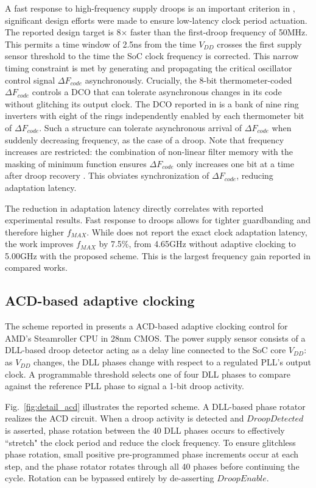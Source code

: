 \documentclass[twoside,9pt,journal,letterpage]{IEEEtran}
\begin{document}
A fast response to high-frequency supply droops is an important criterion in \cite{hashimoto2018}, significant design efforts were made to ensure low-latency clock period actuation. The reported design target is 8$\times$ faster than the first-droop frequency of 50MHz. This permits a time window of 2.5ns from the time $V_{DD}$ crosses the first supply sensor threshold to the time the SoC clock frequency is corrected. This narrow timing constraint is met by generating and propagating the critical oscillator control signal $\Delta F_{code}$ asynchronously. Crucially, the 8-bit thermometer-coded $\Delta F_{code}$ controls a DCO that can tolerate asynchronous changes in its code without glitching its output clock. The DCO reported in \cite{hashimoto2018} is a bank of nine ring inverters with eight of the rings independently enabled by each thermometer bit of $\Delta F_{code}$. Such a structure can tolerate asynchronous arrival of $\Delta F_{code}$ when suddenly decreasing frequency, as the case of a droop. Note that frequency increases are restricted: the combination of non-linear filter memory with the masking of minimum function ensures $\Delta F_{code}$ only increases one bit at a time after droop recovery \cite{hashimoto2018}. This obviates synchronization of $\Delta F_{code}$, reducing adaptation latency.

The reduction in adaptation latency directly correlates with reported experimental results. Fast response to droops allows for tighter guardbanding and therefore higher $f_{MAX}$. While \cite{hashimoto2018} does not report the exact clock adaptation latency, the work improves $f_{MAX}$ by 7.5\%, from 4.65GHz without adaptive clocking to 5.00GHz with the proposed scheme. This is the largest frequency gain reported in compared works.

\subsection{ACD-based adaptive clocking}
\label{sec:details_acd}
The scheme reported in \cite{wilcox2015} presents a ACD-based adaptive clocking control for AMD's Steamroller CPU in 28nm CMOS. The power supply sensor consists of a DLL-based droop detector acting as a delay line connected to the SoC core $V_{DD}$: as $V_{DD}$ changes, the DLL phases change with respect to a regulated PLL's output clock. A programmable threshold selects one of four DLL phases to compare against the reference PLL phase to signal a 1-bit droop activity.

Fig.\ \ref{fig:detail_acd} illustrates the reported scheme. A DLL-based phase rotator realizes the ACD circuit. When a droop activity is detected and $DroopDetected$ is asserted, phase rotation between the 40 DLL phases occurs to effectively ``stretch" the clock period and reduce the clock frequency. To ensure glitchless phase rotation, small positive pre-programmed phase increments occur at each step, and the phase rotator rotates through all 40 phases before continuing the cycle. Rotation can be bypassed entirely by de-asserting $DroopEnable$. 
\end{document}
